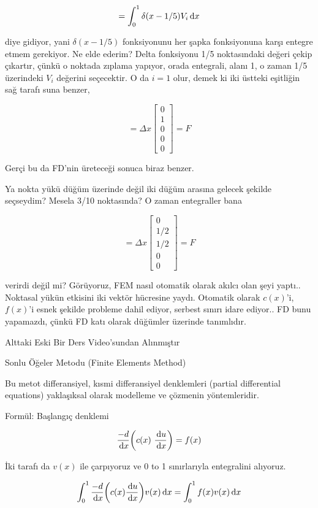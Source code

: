 \documentclass[12pt,fleqn]{article}\usepackage{../../common}
\begin{document}
$$
= \int _{0}^{1} \delta (x-1/5) V_i \,\mathrm{d} x
$$

diye gidiyor, yani $\delta (x-1/5)$ fonksiyonunu her şapka fonksiyonuna karşı
entegre etmem gerekiyor. Ne elde ederim? Delta fonksiyonu 1/5 noktasındaki
değeri çekip çıkartır, çünkü o noktada zıplama yapıyor, orada entegrali, alanı
1, o zaman 1/5 üzerindeki $V_i$ değerini seçecektir. O da $i=1$ olur, demek ki
iki üstteki eşitliğin sağ tarafı suna benzer,

$$
= \Delta x
\left[\begin{array}{r}
0 \\ 1 \\ 0 \\ 0 \\ 0
\end{array}\right] = F
$$

Gerçi bu da FD'nin üreteceği sonuca biraz benzer.

Ya nokta yükü düğüm üzerinde değil iki düğüm arasına gelecek şekilde seçseydim?
Mesela 3/10 noktasında? O zaman entegraller bana

$$
= \Delta x
\left[\begin{array}{r}
0 \\ 1/2 \\ 1/2 \\ 0 \\ 0
\end{array}\right] = F
$$

verirdi değil mi? Görüyoruz, FEM nasıl otomatik olarak akılcı olan şeyi yaptı..
Noktasal yükün etkisini iki vektör hücresine yaydı. Otomatik olarak $c(x)$'i,
$f(x)$'i esnek şekilde probleme dahil ediyor, serbest sınırı idare ediyor..  FD
bunu yapamazdı, çünkü FD katı olarak düğümler üzerinde tanımlıdır.

\newpage

Alttaki Eski Bir Ders Video'sundan Alınmıştır

Sonlu Öğeler Metodu (Finite Elements Method)

Bu metot differansiyel, kısmi differansiyel denklemleri (partial differential
equations) yaklaşıksal olarak modelleme ve çözmenin yöntemleridir.

Formül: Başlangıç denklemi

$$ \frac{-d}{\,\mathrm{d} x} \bigg( c(x) \ \frac{\,\mathrm{d} u}{\,\mathrm{d} x} \bigg) = f(x) $$

İki tarafı da  $v(x)$ ile çarpıyoruz ve 0 to 1 sınırlarıyla entegralini alıyoruz.

$$
\int_0^1 \frac{-d}{\,\mathrm{d} x} \bigg( c(x) \frac{\,\mathrm{d} u}{\,\mathrm{d} x} \bigg) v(x)\,\mathrm{d} x
= \int_0^1 f(x)v(x) \,\mathrm{d} x
$$
\end{document}
